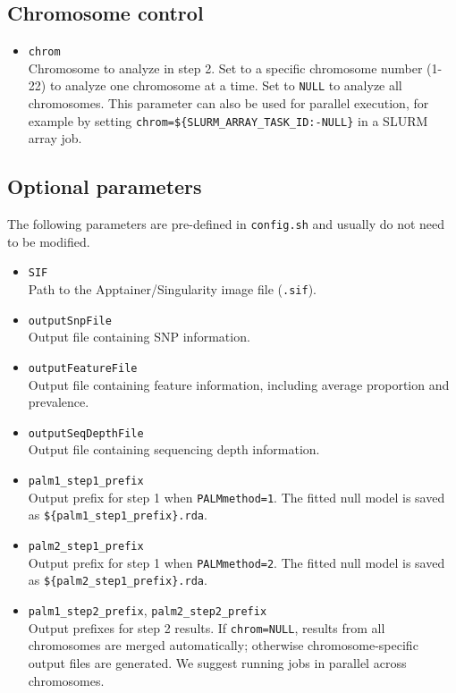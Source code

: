 \documentclass[11pt]{article}
\begin{document}
\subsection*{Chromosome control}

\begin{itemize}
  \item \texttt{chrom} \\
  Chromosome to analyze in step 2.  
  Set to a specific chromosome number (1-22) to analyze one chromosome at a time.
  Set to \texttt{NULL} to analyze all chromosomes.
  This parameter can also be used for parallel execution, for example by
  setting \texttt{chrom=\$\{SLURM\_ARRAY\_TASK\_ID:-NULL\}} in a SLURM array job.
\end{itemize}

\subsection*{Optional parameters}

The following parameters are pre-defined in \texttt{config.sh} and usually do not need to be modified.

\begin{itemize}
  \item \texttt{SIF} \\
  Path to the Apptainer/Singularity image file (\texttt{.sif}).

  \item \texttt{outputSnpFile} \\
  Output file containing SNP information.

  \item \texttt{outputFeatureFile} \\
  Output file containing feature information, including average proportion and prevalence.

  \item \texttt{outputSeqDepthFile} \\
  Output file containing sequencing depth information.

  \item \texttt{palm1\_step1\_prefix} \\
  Output prefix for step 1 when \texttt{PALMmethod=1}.
  The fitted null model is saved as \texttt{\$\{palm1\_step1\_prefix\}.rda}.

  \item \texttt{palm2\_step1\_prefix} \\
  Output prefix for step 1 when \texttt{PALMmethod=2}.
  The fitted null model is saved as \texttt{\$\{palm2\_step1\_prefix\}.rda}.

  \item \texttt{palm1\_step2\_prefix}, \texttt{palm2\_step2\_prefix} \\
  Output prefixes for step 2 results.  
  If \texttt{chrom=NULL}, results from all chromosomes are merged automatically;
  otherwise chromosome-specific output files are generated.
  We suggest running jobs in parallel across chromosomes.
\end{itemize}
\end{document}
